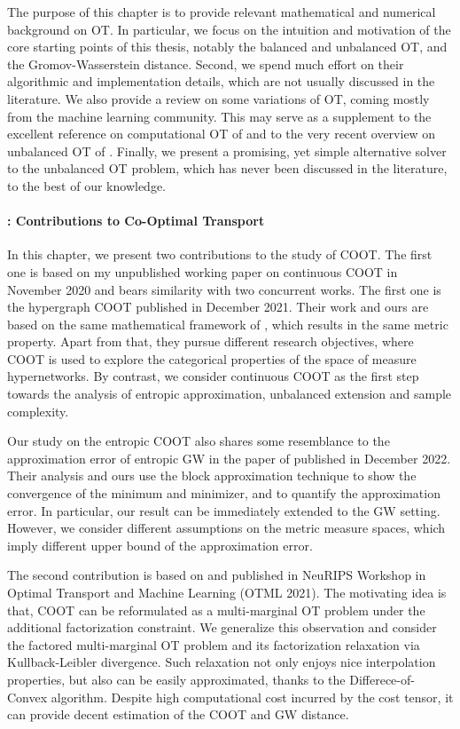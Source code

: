 The purpose of this chapter is to provide relevant mathematical and numerical background
on OT. In particular, we focus on the intuition and motivation of the core starting points
of this thesis, notably the balanced and unbalanced OT, and the Gromov-Wasserstein distance.
Second, we spend much effort on their algorithmic and implementation details, which are not
usually discussed in the literature. We also provide a review on some variations of OT,
coming mostly from the machine learning community. This may serve as a supplement
to the excellent reference on computational OT of \citet{Peyre19} and to the very recent
overview on unbalanced OT of \citet{Sejourne22}.
Finally, we present a promising, yet simple alternative solver to the unbalanced OT problem,
which has never been discussed in the literature, to the best of our knowledge.

\paragraph{: Contributions to Co-Optimal Transport}

In this chapter, we present two contributions to the study of COOT.
The first one is based on my unpublished working paper
on continuous COOT in November 2020 and bears similarity with two concurrent works.
The first one is the hypergraph COOT \citep{Chowdhury21b} published in December 2021.
Their work and ours are based on the same mathematical framework of \citet{Chowdhury19},
which results in the same metric property. Apart from that, they pursue different research objectives,
where COOT is used to explore the categorical properties of the space of measure hypernetworks.
By contrast, we consider continuous COOT as the first step towards the analysis of
entropic approximation, unbalanced extension and sample complexity.

Our study on the entropic COOT also shares some resemblance to the approximation error of
entropic GW in the paper of \citet{Zhang23} published in December 2022.
Their analysis and ours use the block approximation technique \citep{Carlier17}
to show the convergence of the minimum and minimizer, and to quantify the approximation error.
In particular, our result can be immediately extended to the GW setting. However,
we consider different assumptions on the metric measure spaces,
which imply different upper bound of the approximation error.

The second contribution is based on \citep{Tran21} and published in NeuRIPS Workshop in Optimal
Transport and Machine Learning (OTML 2021). The motivating idea is that,
COOT can be reformulated as a multi-marginal OT problem under the additional factorization constraint.
We generalize this observation and consider the factored multi-marginal OT problem
and its factorization relaxation via Kullback-Leibler divergence.
Such relaxation not only enjoys nice interpolation properties, but also
can be easily approximated, thanks to the Differece-of-Convex algorithm.
Despite high computational cost incurred by the cost tensor,
it can provide decent estimation of the COOT and GW distance.


